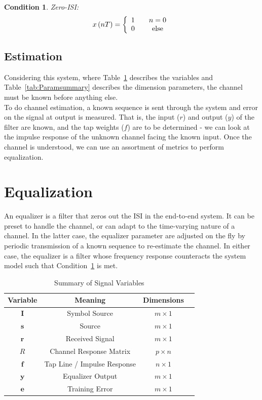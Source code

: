 \documentclass[]{article}
\newtheorem{thm}{Condition}
\begin{document}
\begin{thm}
\label{thm:zero}
Zero-ISI:
$$x\left(nT\right) = \left\{
\begin{array}{c c}
1 & \quad n=0 \\
0 & \quad \text{else}
\end{array} \right.$$
\end{thm}

\subsection{Estimation}
\label{sec:estimate}
Considering this system, where Table~\ref{tab:filtersummary} describes the variables and Table~\ref{tab:Paramsummary} describes the dimension parameters, the channel must be known before anything else. \\

To do channel estimation, a known sequence is sent through the system and error on the signal at output is measured.  That is, the input ($r$) and output ($y$) of the filter are known, and the tap weights ($f$) are to be determined - we can look at the impulse response of the unknown channel facing the known input.  Once the channel is understood, we can use an assortment of metrics to perform equalization.

\section{Equalization}
\label{sec:equal}
An equalizer is a filter that zeros out the ISI in the end-to-end system.  It can be preset to handle the channel, or can adapt to the time-varying nature of a channel.  In the latter case, the equalizer parameter are adjusted on the fly by periodic transmission of a known sequence to re-estimate the channel.  In either case, the equalizer is a filter whose frequency response counteracts the system model such that Condition~\ref{thm:zero} is met. 

\begin{table}[H]
\begin{center}
\begin{tabular}{|c|c|c|c|}
\hline Variable & Meaning & Dimensions \\
\hline \hline
$\mathbf{I}$ & Symbol Source & $ m \times 1$ \\ \hline
$\mathbf{s}$ & Source & $m\times 1 $\\ \hline
$\mathbf{r}$ & Received Signal & $m\times 1$ \\ \hline
$R$ & Channel Response Matrix & $p\times n$ \\ \hline
$\mathbf{f}$ & Tap Line / Impulse Response & $n\times 1 $ \\ \hline
$\mathbf{y}$ & Equalizer Output & $ m\times 1 $ \\ \hline
 $\mathbf{e}$ & Training Error & $ m\times 1 $ \\ \hline
\end{tabular}
\caption{Summary of Signal Variables} \label{tab:filtersummary}
\end{center}
\end{table}
\end{document}
